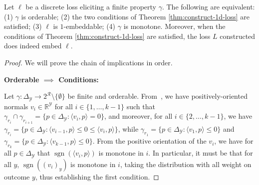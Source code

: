 \documentclass[final]{colt2020} %
\newcommand{\Comments}{1}
\newcommand{\mytodo}[2]{\ifnum\Comments=1%
	\todo[linecolor=#1!80!black,backgroundcolor=#1,bordercolor=#1!80!black]{#2}\fi}
\newcommand{\raft}[1]{\mytodo{green!20!white}{RF: #1}}
\newcommand{\reals}{\mathbb{R}}
\newcommand{\simplex}{\Delta_\Y}
\newcommand{\R}{\mathcal{R}}
\newcommand{\Y}{\mathcal{Y}}
\newcommand{\inprod}[2]{\langle #1, #2 \rangle}%
\newcommand{\ones}{\mathbbm{1}}
\DeclareMathOperator*{\sgn}{sgn}
\begin{document}
\begin{theorem}
  Let $\ell$ be a discrete loss eliciting a finite property $\gamma$.
  The following are equivalent:
  (1) $\gamma$ is orderable;
  (2) the two conditions of Theorem \ref{thm:construct-1d-loss} are satisfied;
  (3) $\ell$ is $1$-embeddable;
  (4) $\gamma$ is monotone.
  Moreover, when the conditions of Theorem \ref{thm:construct-1d-loss} are satisfied, the loss $L$ constructed does indeed embed $\ell$.
\end{theorem}
\begin{proof}
  We will prove the chain of implications in order.

  \noindent\textbf{Orderable $\implies$ Conditions:}

  Let $\gamma:\simplex\to 2^\R \setminus \{\emptyset\}$ be finite and orderable.
  From~\citet[Theorem 4]{lambert2018elicitation}, we have positively-oriented normals $v_i\in\reals^\Y$ for all $i \in \{1,\ldots,k-1\}$ such that $\gamma_{r_i} \cap \gamma_{r_{i+1}} = \{p\in\simplex : \inprod{v_i}{p} = 0\}$, and moreover, for all $i \in \{2,\ldots,k-1\}$, we have $\gamma_{r_i} = \{p\in\simplex : \inprod{v_{i-1}}{p} \leq 0 \leq \inprod{v_i}{p}\}$, while $\gamma_{r_1} = \{p\in\simplex : \inprod{v_1}{p} \leq 0\}$ and $\gamma_{r_k} = \{p\in\simplex : \inprod{v_{k-1}}{p} \leq 0\}$.
  From the positive orientation of the $v_i$, we have for all $p\in\simplex$ that $\sgn(\inprod{v_i}{p})$ is monotone in $i$.
  In particular, it must be that for all $y$, $\sgn((v_i)_y)$ is monotone in $i$, taking the distribution with all weight on outcome $y$, thus establishing the first condition.


\end{proof}
\end{document}
